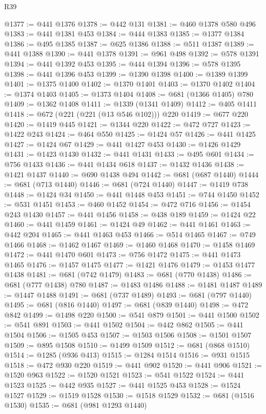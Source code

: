 \begin{lexlean}{R39}
\begin{coremodule}
@1377 := @441 @1376
@1378 := @442 @131
@1381 := @460 @1378 @580 @496
@1383 := @441 @1381 @453
@1384 := @444 @1383
@1385 := @1377 @1384
@1386 := @495 @1385
@1387 := @625 @1386
@1388 := @511 @1387
@1389 := @441 @1388
@1390 := @441 @1378
@1391 := @961 @498
@1392 := @578 @1391
@1394 := @441 @1392 @453
@1395 := @444 @1394
@1396 := @578 @1395
@1398 := @441 @1396 @453
@1399 := @1390 @1398
@1400 := @1389 @1399
@1401 := @1375 @1400
@1402 := @1370 @1401
@1403 := @1370 @1402
@1404 := @1374 @1403
@1405 := @1373 @1404
@1408 := @681 (@1366 @1405) @780
@1409 := @1362 @1408
@1411 := @1339 (@1341 @1409)
@1412 := @405 @1411
@1418 := @672 (@221 (@221 (@13 @546 @102))) @220
@1419 := @677 @220
@1420 := @1419 @445
@1421 := @1344 @220
@1422 := @472 @727
@1423 := @1422 @243
@1424 := @464 @550
@1425 := @1424 @57
@1426 := @441 @1425
@1427 := @1424 @67
@1429 := @441 @1427 @453
@1430 := @1426 @1429
@1431 := @1423 @1430
@1432 := @441 @1431
@1433 := @495 @601
@1434 := @756 @1433
@1436 := @441 @1434 @618
@1437 := @1432 @1436
@1438 := @1421 @1437
@1440 := @690 @1438 @494
@1442 := @681 (@687 @1440)
@1444 := @681 (@713 @1440)
@1446 := @681 (@724 @1440)
@1447 := @1419 @738
@1448 := @1424 @34
@1450 := @441 @1448 @453
@1451 := @744 @1450
@1452 := @531 @1451
@1453 := @460 @1452
@1454 := @472 @716
@1456 := @1454 @243 @1430
@1457 := @441 @1456
@1458 := @438 @189
@1459 := @1424 @22
@1460 := @441 @1459
@1461 := @1424 @49
@1462 := @441 @1461
@1463 := @442 @204
@1465 := @441 @1463 @453
@1466 := @514 @1465
@1467 := @749 @1466
@1468 := @1462 @1467
@1469 := @1460 @1468
@1470 := @1458 @1469
@1472 := @441 @1470 @601
@1473 := @756 @1472
@1475 := @441 @1473 @1465
@1476 := @1457 @1475
@1477 := @1421 @1476
@1479 := @1453 @1477 @1438
@1481 := @681 (@742 @1479)
@1483 := @681 (@770 @1438)
@1486 := @681 (@777 @1438) @780
@1487 := @1483 @1486
@1488 := @1481 @1487
@1489 := @1447 @1488
@1491 := @681 (@737 @1489)
@1493 := @681 (@797 @1440)
@1495 := @681 (@816 @1440)
@1497 := @681 (@839 @1440)
@1498 := @472 @842
@1499 := @1498 @220
@1500 := @541 @879
@1501 := @441 @1500
@1502 := @541 @891
@1503 := @441 @1502
@1504 := @442 @862
@1505 := @441 @1504
@1506 := @1505 @453
@1507 := @1503 @1506
@1508 := @1501 @1507
@1509 := @895 @1508
@1510 := @1499 @1509
@1512 := @681 (@868 @1510)
@1514 := @1285 (@936 @413)
@1515 := @1284 @1514
@1516 := @931 @1515
@1518 := @472 @930 @220
@1519 := @441 @902
@1520 := @441 @906
@1521 := @1520 @963
@1522 := @1520 @1521
@1523 := @541 @1522
@1524 := @441 @1523
@1525 := @442 @935
@1527 := @441 @1525 @453
@1528 := @1524 @1527
@1529 := @1519 @1528
@1530 := @1518 @1529
@1532 := @681 (@1516 @1530)
@1535 := @681 (@981 @1293 @1440)

\end{coremodule}
\end{lexlean}
